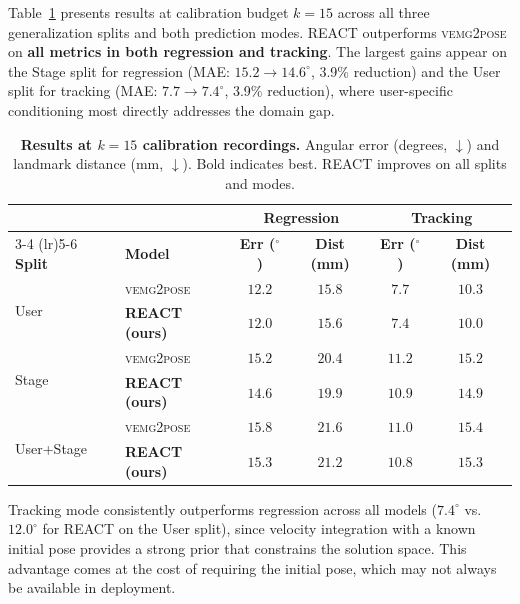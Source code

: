 \documentclass[10pt]{article}
\begin{document}
Table~\ref{tab:results} presents results at calibration budget $k{=}15$ across all three generalization splits and both prediction modes. REACT outperforms \textsc{vemg2pose} on \textbf{all metrics in both regression and tracking}. The largest gains appear on the Stage split for regression (MAE: $15.2 \to 14.6^\circ$, 3.9\% reduction) and the User split for tracking (MAE: $7.7 \to 7.4^\circ$, 3.9\% reduction), where user-specific conditioning most directly addresses the domain gap.

\begin{table}[H]
\centering
\caption{\textbf{Results at $k{=}15$ calibration recordings.} Angular error (degrees, $\downarrow$) and landmark distance (mm, $\downarrow$). Bold indicates best. REACT improves on all splits and modes.}
\label{tab:results}
\small
\begin{tabular}{llcccc}
\toprule
& & \multicolumn{2}{c}{\textbf{Regression}} & \multicolumn{2}{c}{\textbf{Tracking}} \\
\cmidrule(lr){3-4} \cmidrule(lr){5-6}
\textbf{Split} & \textbf{Model} & \textbf{Err ($^\circ$)} & \textbf{Dist (mm)} & \textbf{Err ($^\circ$)} & \textbf{Dist (mm)} \\
\midrule
\multirow{2}{*}{User}
  & \textsc{vemg2pose}    & $12.2$ & $15.8$ & $7.7$  & $10.3$ \\
  & \textbf{REACT (ours)} & $\mathbf{12.0}$ & $\mathbf{15.6}$ & $\mathbf{7.4}$  & $\mathbf{10.0}$ \\
\midrule
\multirow{2}{*}{Stage}
  & \textsc{vemg2pose}    & $15.2$ & $20.4$ & $11.2$ & $15.2$ \\
  & \textbf{REACT (ours)} & $\mathbf{14.6}$ & $\mathbf{19.9}$ & $\mathbf{10.9}$ & $\mathbf{14.9}$ \\
\midrule
\multirow{2}{*}{User+Stage}
  & \textsc{vemg2pose}    & $15.8$ & $21.6$ & $11.0$ & $15.4$ \\
  & \textbf{REACT (ours)} & $\mathbf{15.3}$ & $\mathbf{21.2}$ & $\mathbf{10.8}$ & $\mathbf{15.3}$ \\
\bottomrule
\end{tabular}
\end{table}

Tracking mode consistently outperforms regression across all models ($7.4^\circ$ vs.\ $12.0^\circ$ for REACT on the User split), since velocity integration with a known initial pose provides a strong prior that constrains the solution space. This advantage comes at the cost of requiring the initial pose, which may not always be available in deployment.
\end{document}
